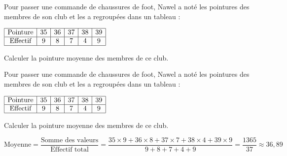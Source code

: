 \begin{exercice*}[Pointures]
    Pour passer une commande de chaussures de foot, Nawel a noté les pointures des membres de son club et les a regroupées dans un tableau :

    \medskip
    $\begin{array}{|c|c|c|c|c|c|}
        \hline
        \text{Pointure} & 35 & 36 & 37 & 38 & 39 \\\hline
        \text{Effectif} & 9 & 8 & 7 & 4 & 9 \\\hline
    \end{array}$

    \medskip
    Calculer la pointure moyenne des membres de ce club.

\end{exercice*}
\begin{corrige}
    Pour passer une commande de chaussures de foot, Nawel a noté les pointures des membres de son club et les a regroupées dans un tableau :

    \medskip
    $\begin{array}{|c|c|c|c|c|c|}
        \hline
        \text{Pointure} & 35 & 36 & 37 & 38 & 39 \\\hline
        \text{Effectif} & 9 & 8 & 7 & 4 & 9 \\\hline
    \end{array}$

    \medskip
    Calculer la pointure moyenne des membres de ce club.

    {\red
        $\text{Moyenne} = \dfrac{\text{Somme des valeurs}}{\text{Effectif total}} =\dfrac{35 \times 9+ 36 \times 8+ 37 \times 7+ 38 \times 4+ 39 \times 9}{9+ 8+ 7+ 4+ 9} = \dfrac{1365}{37} \approx36{,}89$\\
    }
\end{corrige}

